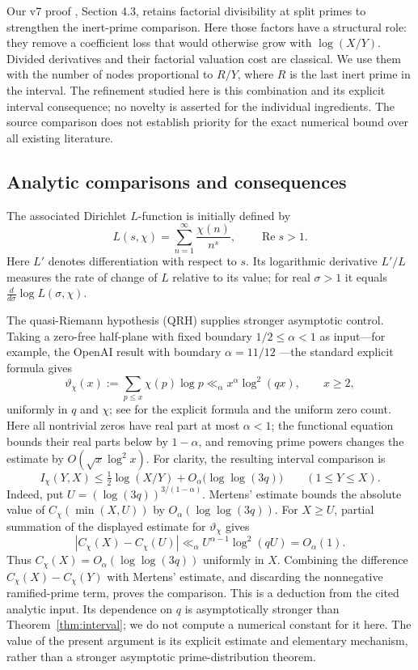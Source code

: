 \documentclass[11pt]{article}
\begin{document}
Our v7 proof \cite{v7}, Section 4.3, retains factorial divisibility at
split primes to strengthen the inert-prime comparison. Here those
factors have a structural role: they remove a coefficient loss that
would otherwise grow with $\log(X/Y)$. Divided derivatives and their
factorial valuation cost are classical. We use them with the number
of nodes proportional to $R/Y$, where $R$ is the last inert prime
in the interval. The refinement studied here is this combination and
its explicit interval consequence; no novelty is asserted for the
individual ingredients. The source comparison does not establish
priority for the exact numerical bound over all existing literature.

\subsection{Analytic comparisons and consequences}
The associated Dirichlet $L$-function is initially defined by
\[
 L(s,\chi)=\sum_{n=1}^{\infty}\frac{\chi(n)}{n^s},
 \qquad \operatorname{Re}s>1.
\]
Here $L'$ denotes differentiation with respect to $s$. Its logarithmic
derivative $L'/L$ measures the rate of change of $L$ relative to its
value; for real $\sigma>1$ it equals
$\frac{d}{d\sigma}\log L(\sigma,\chi)$.

The quasi-Riemann hypothesis (QRH) supplies stronger asymptotic control.
Taking a zero-free half-plane with fixed boundary $1/2\le\alpha<1$
as input---for example, the
OpenAI result with boundary $\alpha=11/12$ \cite[Theorem 1.1]{qrh}---the
standard explicit formula gives
\[
 \vartheta_\chi(x):=\sum_{p\le x}\chi(p)\log p
 \ll_\alpha x^\alpha\log^2(qx),\qquad x\ge2,
\]
uniformly in $q$ and $\chi$; see \cite[Section 11.1]{kedlaya} for the
explicit formula and the uniform zero count. Here all nontrivial zeros
have real part at most $\alpha<1$; the functional equation bounds
their real parts below by $1-\alpha$, and removing prime powers changes
the estimate by $O(\sqrt x\log^2x)$.
For clarity, the resulting interval comparison is
\[
 I_\chi(Y,X)\le\tfrac12\log(X/Y)
                 +O_\alpha\bigl(\log\log(3q)\bigr)
 \qquad(1\le Y\le X).
\]
Indeed, put $U=(\log(3q))^{3/(1-\alpha)}$. Mertens' estimate bounds
the absolute value of $C_\chi(\min(X,U))$ by $O_\alpha(\log\log(3q))$.
For $X\ge U$, partial summation of the displayed estimate for
$\vartheta_\chi$ gives
\[
 |C_\chi(X)-C_\chi(U)|
 \ll_\alpha U^{\alpha-1}\log^2(qU)=O_\alpha(1).
\]
Thus $C_\chi(X)=O_\alpha(\log\log(3q))$ uniformly in $X$.
Combining the difference $C_\chi(X)-C_\chi(Y)$ with Mertens' estimate,
and discarding the nonnegative ramified-prime term, proves the
comparison. This is a deduction from the cited analytic input.
Its dependence on $q$ is asymptotically stronger than
Theorem~\ref{thm:interval}; we do not compute a numerical constant for
it here. The value of the present argument is its explicit estimate
and elementary mechanism, rather than a stronger asymptotic
prime-distribution theorem.
\end{document}
